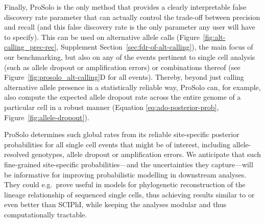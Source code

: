 \documentclass[12pt,inline]{wlscirep}
\begin{document}
Finally, ProSolo is the only method that provides a clearly interpretable false discovery rate parameter that can actually control the trade-off between precision and recall (and this false discovery rate is the only parameter any user will have to specify).
This can be used on alternative allele calls (Figure~\ref{fig:alt-calling_prec-rec}, Supplement Section~\ref{sec:fdr-of-alt-calling}), the main focus of our benchmarking, but also on any of the events pertinent to single cell analysis (such as allele dropout or amplification errors) or combinations thereof (see Figure~\ref{fig:prosolo_alt-calling}D for all events).
Thereby, beyond just calling alternative allele presence in a statistically reliable way, ProSolo can, for example, also compute the expected allele dropout rate across the entire genome of a particular cell in a robust manner (Equation \ref{eq:ado-posterior-prob}, Figure~\ref{fig:allele-dropout}).

ProSolo determines such global rates from its reliable site-specific posterior probabilities for all single cell events that might be of interest, including allele-resolved genotypes, allele dropout or amplification errors. 
We anticipate that such fine-grained site-specific probabilities---and the uncertainties they capture---will be informative for improving probabilistic modelling in downstream analyses.
They could e.g.~prove useful in models for phylogenetic reconstruction of the lineage relationship of sequenced single cells\cite{singer_single-cell_2018,zafar_siclonefit:_2018,koptagel_scuphr:_2018}, thus achieving results similar to or even better than SCIPhI, while keeping the analyses modular and thus computationally tractable\cite{lahnemann_eleven_2020}.
\end{document}
